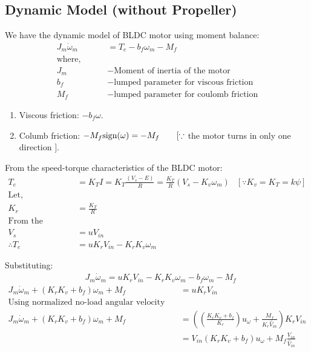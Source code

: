 \subsection{Dynamic Model (without Propeller)}
We have the dynamic model of BLDC motor using moment balance:
\begin{align*}
    J_m \dot \omega_m &= T_e - b_f \omega_m - M_f\\
    \text{where, } \qquad &\\
    J_m &- \text{Moment of inertia of the motor}\\
    b_f &- \text{lumped parameter for viscous friction}\\
    M_f &- \text{lumped parameter for coulomb friction}
\end{align*}
\begin{enumerate}
    \item Viscous friction: $-b_f \omega$.
    \item Columb friction: $-M_{f} \text{sign}(\omega) = -M_{f} \qquad [\because$ the motor turns in only one direction $]$.
\end{enumerate}

\medskip

From the speed-torque characteristics of the BLDC motor:
\begin{align*}
    T_e &= K_T I = K_T \frac{(V_s - E)}{R} = \frac{K_T}{R} (V_s - K_v \omega_m)  & [\because K_v = K_T = k \psi]\\
    \text{Let, }\qquad &\\
    K_r &= \frac{K_T}{R}\\
    \text{From the definition of Input to ESC}\qquad &\\
    V_s &= u V_{in}\\
    \therefore T_e &= u K_r V_{in} - K_r K_v \omega_m
\end{align*}

Substituting:
\begin{align*}
    &J_m \dot \omega_m = u K_r V_{in}  - K_rK_v \omega_m  - b_f \omega_m - M_f
\end{align*}
\begin{align*}
    J_m \dot \omega_m + (K_r K_v  + b_f) \omega_m + M_f &= u K_r V_{in}\\
    \text{Using normalized no-load angular velocity input:} &\\
    J_m \dot \omega_m + (K_r K_v  + b_f) \omega_m + M_f &= \left(\left(\frac{K_r K_v  + b_f}{K_r} \right) u_{\omega} + \frac{M_f}{K_r \hat V_{in}} \right) K_r V_{in}\\
    &= V_{in}(K_r K_v  + b_f)u_{\omega} + M_f \frac{V_{in}}{\hat V_{in}}
\end{align*}


